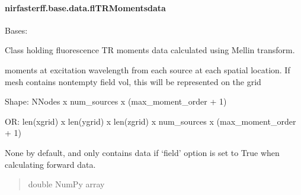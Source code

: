 \documentclass[letterpaper,10pt,english]{sphinxmanual}
\begin{document}
\paragraph{nirfasterff.base.data.flTRMomentsdata}
\label{\detokenize{_autosummary/nirfasterff.base.data.flTRMomentsdata:nirfasterff-base-data-fltrmomentsdata}}\label{\detokenize{_autosummary/nirfasterff.base.data.flTRMomentsdata::doc}}

\begin{fulllineitems}
\label{\detokenize{_autosummary/nirfasterff.base.data.flTRMomentsdata:nirfasterff.base.data.flTRMomentsdata}}
\pysigstartsignatures
{}
\pysigstopsignatures
\sphinxAtStartPar
Bases: 

\sphinxAtStartPar
Class holding fluorescence TR moments data calculated using Mellin transform.

\begin{fulllineitems}
\label{\detokenize{_autosummary/nirfasterff.base.data.flTRMomentsdata:nirfasterff.base.data.flTRMomentsdata.phix}}
\pysigstartsignatures
{}
\pysigstopsignatures
\sphinxAtStartPar
moments at excitation wavelength from each source at each spatial location. If mesh contains non\sphinxhyphen{}tempty field vol, this will be represented on the grid

\sphinxAtStartPar
Shape: NNodes x num\_sources x (max\_moment\_order + 1)

\sphinxAtStartPar
OR: len(xgrid) x len(ygrid) x len(zgrid) x num\_sources x (max\_moment\_order + 1)

\sphinxAtStartPar
None by default, and only contains data if ‘field’ option is set to True when calculating forward data.
\begin{quote}\begin{description}
\sphinxAtStartPar
double NumPy array

\end{description}\end{quote}

\end{fulllineitems}


\end{fulllineitems}
\end{document}
